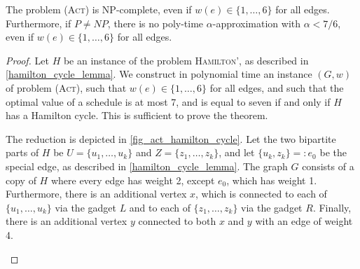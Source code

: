\documentclass[runningheads]{llncs}
\numberwithin{equation}{section}
\newcommand{\set}[1]{\{ #1 \}}
\newcommand{\fromto}[2]{\set{#1, \ldots, #2}}
\newcommand{\act}{\textsc{(Act)}}
\begin{document}
\begin{theorem}
\label{corollary_act_no_approx}
The problem {\act} is NP-complete, even if $w(e) \in \fromto{1}{6}$ for all edges. Furthermore, if $P \neq NP$, there is no poly-time $\alpha$-approximation with $\alpha < 7/6$, even if $w(e) \in \fromto{1}{6}$ for all edges.
\end{theorem}
\begin{proof}
Let $H$ be an instance of the problem \textsc{Hamilton'}, as described in \cref{hamilton_cycle_lemma}. We construct in polynomial time an instance $(G, w)$ of problem {\act}, such that $w(e) \in \fromto{1}{6}$ for all edges, and such that the optimal value of a schedule is at most 7, and is equal to seven if and only if $H$ has a Hamilton cycle. This is sufficient to prove the theorem.

The reduction is depicted in \cref{fig_act_hamilton_cycle}. Let the two bipartite parts of $H$ be $U = \fromto{u_1}{u_k}$ and $Z = \fromto{z_1}{z_k}$, and let $\set{u_k, z_k} =: e_0$ be the special edge, as described in \cref{hamilton_cycle_lemma}. The graph $G$ consists of a copy of $H$ where every edge has weight 2, except $e_0$, which has weight 1. Furthermore, there is an additional vertex $x$, which is connected to each of $\fromto{u_1}{u_k}$ via the gadget $L$ and to each of $\fromto{z_1}{z_k}$ via the gadget $R$. Finally, there is an additional vertex $y$ connected to both $x$ and $y$ with an edge of weight 4.
\begin{figure}[htpb]
     \centering
     \begin{subfigure}[b]{0.4\textwidth}
         \centering

\end{subfigure}
\end{figure}
\end{proof}
\end{document}

